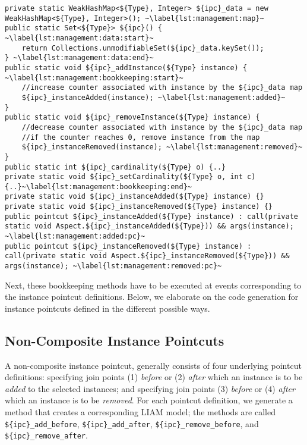 \begin{lstlisting}[float, caption={Template of generated code for instance set management.},label=lst:management]
private static WeakHashMap<${Type}, Integer> ${ipc}_data = new WeakHashMap<${Type}, Integer>(); ~\label{lst:management:map}~
public static Set<${Type}> ${ipc}() { ~\label{lst:management:data:start}~
	return Collections.unmodifiableSet(${ipc}_data.keySet());
} ~\label{lst:management:data:end}~
public static void ${ipc}_addInstance(${Type} instance) { ~\label{lst:management:bookkeeping:start}~
	//increase counter associated with instance by the ${ipc}_data map
	${ipc}_instanceAdded(instance); ~\label{lst:management:added}~
}
public static void ${ipc}_removeInstance(${Type} instance) {
	//decrease counter associated with instance by the ${ipc}_data map
	//if the counter reaches 0, remove instance from the map
	${ipc}_instanceRemoved(instance); ~\label{lst:management:removed}~
}
public static int ${ipc}_cardinality(${Type} o) {..}
private static void ${ipc}_setCardinality(${Type} o, int c){..}~\label{lst:management:bookkeeping:end}~
private static void ${ipc}_instanceAdded(${Type} instance) {}
private static void ${ipc}_instanceRemoved(${Type} instance) {}
public pointcut ${ipc}_instanceAdded(${Type} instance) : call(private static void Aspect.${ipc}_instanceAdded(${Type})) && args(instance); ~\label{lst:management:added:pc}~
public pointcut ${ipc}_instanceRemoved(${Type} instance) : call(private static void Aspect.${ipc}_instanceRemoved(${Type})) && args(instance); ~\label{lst:management:removed:pc}~
\end{lstlisting}

Next, these bookkeeping methods have to be executed at events corresponding to the instance pointcut definitions.
Below, we elaborate on the code generation for instance pointcuts defined in the different possible ways.

\subsection{Non-Composite Instance Pointcuts}

A non-composite instance pointcut, generally consists of four underlying pointcut definitions: specifying join points (1) \emph{before} or (2) \emph{after} which an instance is to be \emph{added} to the selected instances; and specifying join points (3) \emph{before} or (4) \emph{after} which an instance is to be \emph{removed}.
For each pointcut definition, we generate a method that creates a corresponding LIAM model; the methods are called \lstinline!${ipc}_add_before!, \lstinline!${ipc}_add_after!, \lstinline!${ipc}_remove_before!, and \lstinline!${ipc}_remove_after!.

